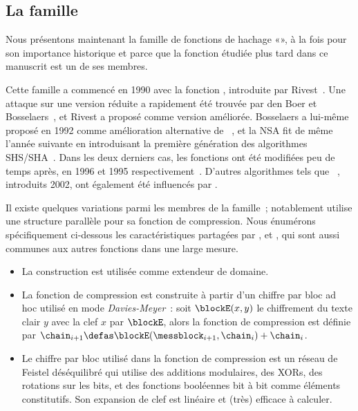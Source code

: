 \subsection{La famille \mdsha}
\label{sec:fmdsha}

Nous présentons maintenant la famille de fonctions de hachage «\mdsha», à la fois pour son importance historique et parce que la fonction \shaone étudiée plus tard
dans ce manuscrit est un de ses membres.

Cette famille a commencé en 1990 avec la fonction \mdfour, introduite par Rivest~\cite{Rivest-md4}.
Une attaque sur une version réduite a rapidement été trouvée par
den Boer et Bosselaers~\cite{DBLP:conf/crypto/BoerB91},
et Rivest a proposé \mdfive comme version améliorée.
Bosselaers a lui-même proposé \ripemd en 1992 comme amélioration alternative de \mdfour~\cite[Chap. 3]{DBLP:books/sp/BosselaersP95},
et la NSA fit de même l'année suivante en introduisant la première génération des algorithmes SHS/SHA~\cite{Nist-SHA0}.
Dans les deux derniers cas, les fonctions ont été modifiées peu de temps après, en
1996 et 1995 respectivement~\cite{DBLP:conf/fse/DobbertinBP96,Nist-SHA1}.
D'autres algorithmes tels que 
\shatwo~\cite{Nist-SHA}, introduits 2002, ont également été influencés par \mdfour.

Il existe quelques variations parmi les membres de la famille~; notablement
\ripemd utilise une structure parallèle pour sa fonction de compression.
Nous énumérons spécifiquement ci-dessous les caractéristiques partagées par
\mdfour, \mdfive et \sha, qui sont aussi communes aux autres fonctions
\mdsha dans une large mesure.
\begin{itemize}
\item La construction \merkdam est utilisée comme extendeur de domaine.
\item La fonction de compression est construite à partir d'un chiffre par bloc ad hoc utilisé en mode \emph{Davies-Meyer}~: 
soit
$\blockE(x,y)$ le chiffrement du texte clair $y$ avec la clef $x$ par  $\blockE$, alors
la fonction de compression est définie par
$\chain_{i+1} \defas \blockE(\messblock_{i+1},\chain_i) + \chain_i$.
\item Le chiffre par bloc utilisé dans la fonction de compression est un réseau de Feistel déséquilibré qui utilise
des additions modulaires, des XORs, des rotations sur les bits, et des fonctions booléennes bit à bit comme éléments constitutifs.
Son expansion de clef est linéaire et (très) efficace à calculer.
\end{itemize}

